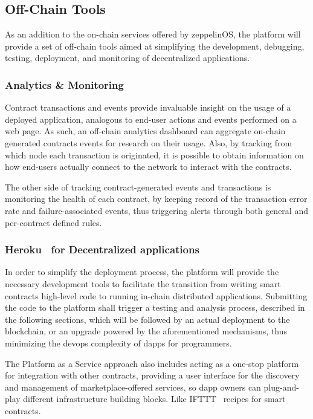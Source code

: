\documentclass[]{article}
\makeatletter
\DeclareRobustCommand{\_}{%
  \leavevmode\vbox{%
    \hrule\@width.5em
          \@height-.26ex
          \@depth\dimexpr.26ex+.28pt\relax}}
\makeatother
\begin{document}
\subsection{Off-Chain Tools}

As an addition to the on-chain services offered by zeppelinOS, the
platform will provide a set of off-chain tools aimed at simplifying the
development, debugging, testing, deployment, and monitoring of
decentralized applications.

\subsubsection{Analytics \& Monitoring}

Contract transactions and events provide invaluable insight on the
usage of a deployed application, analogous to end-user actions and
events performed on a web page. As such, an off-chain analytics
dashboard can aggregate on-chain generated contracts events for research
on their usage. Also, by tracking from which node each transaction is
originated, it is possible to obtain information on how end-users actually
connect to the network to interact with the contracts.

The other side of tracking contract-generated events and transactions
is monitoring the health of each contract, by keeping record of the
transaction error rate and failure-associated events, thus triggering
alerts through both general and per-contract defined rules.

\subsubsection{Heroku~\cite{heroku} for Decentralized applications}

In order to simplify the deployment process, the platform will provide
the necessary development tools to facilitate the transition from
writing smart contracts high-level code to running in-chain distributed
applications. Submitting the code to the platform shall trigger a
testing and analysis process, described in the following sections, which
will be followed by an actual deployment to the blockchain, or an
upgrade powered by the aforementioned mechanisms, thus minimizing the
devops complexity of dapps for programmers.

The Platform as a Service approach also includes acting as a one-stop
platform for integration with other contracts, providing a user
interface for the discovery and management of marketplace-offered
services, so dapp owners can plug-and-play different infrastructure
building blocks. Like IFTTT~\cite{ifttt} recipes for smart contracts.
\end{document}
